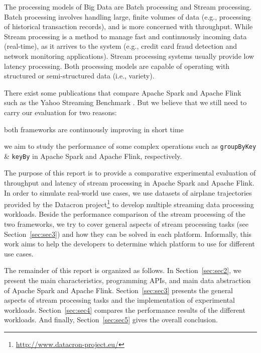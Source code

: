 \documentclass[]{article}
\begin{document}
\par The processing models of Big Data are Batch processing and Stream processing. Batch processing involves handling  large, finite volumes of data (e.g., processing of historical transaction records), and is more concerned with throughput. While Stream processing  is a method to manage fast and continuously incoming data (real-time), as it arrives to the system (e.g., credit card fraud detection and network monitoring applications). Stream processing systems usually  provide low latency processing. Both processing models are capable of operating with structured or semi-structured data (i.e., variety).

\par There exist some publications that compare Apache Spark and Apache Flink
 such as the Yahoo Streaming Benchmark \cite{yahoo}. But we believe that we still need to carry our evaluation for two reasons: \begin{enumerate*}[label=(\roman*)]
\item both frameworks are continuously improving in short time 
\item we aim to study the performance of some complex operations such as \texttt{groupByKey} \& \texttt{keyBy} in Apache Spark and Apache Flink, respectively.
\end{enumerate*}

 

\par The purpose of this report is to provide a comparative experimental evaluation of throughput and latency of stream processing in Apache Spark and Apache Flink. In order to simulate real-world use cases, we use datasets of airplane trajectories provided by the  Datacron project\footnote{\url{http://www.datacron-project.eu/}} to develop multiple streaming data processing workloads. Beside the performance comparison of the stream processing of the two frameworks, we try to cover general aspects of stream processing tasks (see Section~\ref{sec:sec3}) and how they can be solved in each platform. Informally,  this work aims to help the developers to determine which platform to use for different use cases. 


\par The remainder of this report is organized as follows.
In Section~\ref{sec:sec2}, we present the main characteristics, programming APIs, and main data abstraction of Apache Spark and Apache Flink. Section~\ref{sec:sec3} presents the general aspects of stream processing tasks and the implementation of experimental workloads. Section~\ref{sec:sec4}
compares the performance results of the different workloads. And finally, Section~\ref{sec:sec5} gives the overall conclusion.
\end{document}
